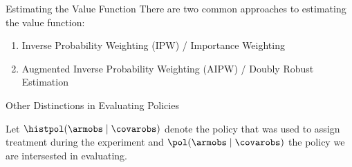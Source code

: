 \documentclass[aspectratio=169, professionalfonts]{beamer}
\begin{document}
\begin{frame}{Estimating the Value Function}
	There are two common approaches to estimating the value function:
	\vfill
	\begin{enumerate}
		\item Inverse Probability Weighting (IPW) / Importance Weighting

		\item Augmented Inverse Probability Weighting (AIPW) / Doubly Robust Estimation
	\end{enumerate}
	\vfill
\end{frame}
\begin{frame}{Other Distinctions in Evaluating Policies}

	Let $\histpol(\armobs \mid \covarobs)$ denote the policy that was used to
	assign treatment during the experiment and $\pol(\armobs \mid \covarobs)$ the
	policy we are intersested in evaluating.

	\begin{columns}[T]
		\begin{column}{.65\textwidth}
		\end{column}
		\pause
		\begin{column}{.35\textwidth}
		\end{column}%
	\end{columns}


\end{frame}
\end{document}
